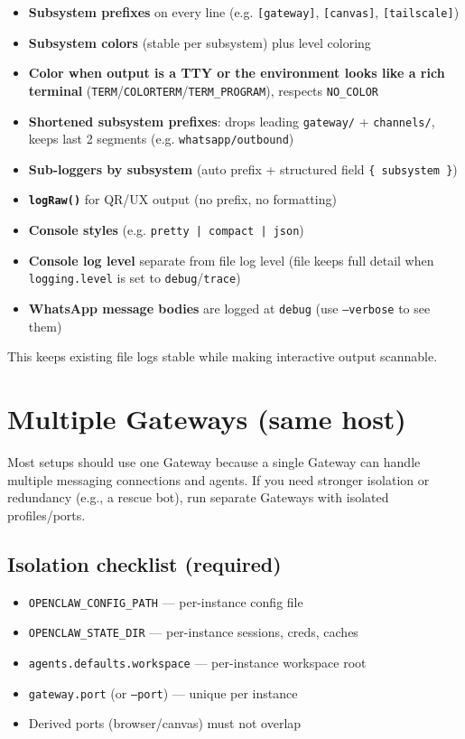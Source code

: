 \begin{itemize}
  \item \textbf{Subsystem prefixes} on every line (e.g. \texttt{[gateway]}, \texttt{[canvas]}, \texttt{[tailscale]})
  \item \textbf{Subsystem colors} (stable per subsystem) plus level coloring
  \item \textbf{Color when output is a TTY or the environment looks like a rich terminal} (\texttt{TERM}/\texttt{COLORTERM}/\texttt{TERM\_PROGRAM}), respects \texttt{NO\_COLOR}
  \item \textbf{Shortened subsystem prefixes}: drops leading \texttt{gateway/} + \texttt{channels/}, keeps last 2 segments (e.g. \texttt{whatsapp/outbound})
  \item \textbf{Sub-loggers by subsystem} (auto prefix + structured field \texttt{\{ subsystem \}})
  \item \textbf{\texttt{logRaw()}} for QR/UX output (no prefix, no formatting)
  \item \textbf{Console styles} (e.g. \texttt{pretty | compact | json})
  \item \textbf{Console log level} separate from file log level (file keeps full detail when \texttt{logging.level} is set to \texttt{debug}/\texttt{trace})
  \item \textbf{WhatsApp message bodies} are logged at \texttt{debug} (use \texttt{--verbose} to see them)
\end{itemize}


This keeps existing file logs stable while making interactive output scannable.


\clearpage

\section{Multiple Gateways (same host)}


Most setups should use one Gateway because a single Gateway can handle multiple messaging connections and agents. If you need stronger isolation or redundancy (e.g., a rescue bot), run separate Gateways with isolated profiles/ports.

\subsection{Isolation checklist (required)}


\begin{itemize}
  \item \texttt{OPENCLAW\_CONFIG\_PATH} — per-instance config file
  \item \texttt{OPENCLAW\_STATE\_DIR} — per-instance sessions, creds, caches
  \item \texttt{agents.defaults.workspace} — per-instance workspace root
  \item \texttt{gateway.port} (or \texttt{--port}) — unique per instance
  \item Derived ports (browser/canvas) must not overlap
\end{itemize}


